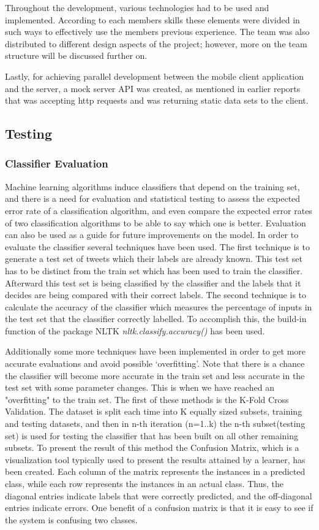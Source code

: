 Throughout the development, various technologies had to be used and implemented. According to each 
members skills these elements were divided in such ways to effectively use the members previous 
experience. The team was also distributed to different design aspects of the project; however, more on the 
team structure will be discussed further on.

Lastly, for achieving parallel development between the mobile client application and the server, 
a mock server API was created, as mentioned in earlier reports that was accepting http requests and 
was returning static data sets to the client. 

\subsection{Testing} 
\subsubsection{Classifier Evaluation} 
Machine learning algorithms induce classifiers that depend on the training set, and there is a need for evaluation and statistical testing to assess the expected error rate of a classification algorithm, and even compare the expected error rates of two classification algorithms to be able to say which one is better. Evaluation can also be used as a guide for future improvements on the model. In order to evaluate the classifier several techniques have been used. The first technique is to generate a test set of tweets which their labels are already known. This test set has to be distinct from the train set which has been used to train the classifier. Afterward this test set is being classified by the classifier and the labels that it decides are being compared with their correct labels. The second technique is to calculate the accuracy of the classifier which measures the percentage of inputs in the test set that the classifier correctly labelled. To accomplish this, the build-in function of the package NLTK \emph{nltk.classify.accuracy()} has been used.

Additionally some more techniques have been implemented in order to get more
accurate evaluations and avoid possible `overfitting'. Note that there is a chance the classifier will become more accurate in the train set and less accurate in the test set with some parameter changes. This is when we have reached an "overfitting" to the train set. The first of these methods is the K-Fold Cross Validation. The dataset is split each time into K equally sized subsets, training and testing datasets, and then in n-th iteration (n=1..k) the n-th subset(testing set) is used for testing the classifier that has been built on all other remaining subsets. To present the result of this method the Confusion Matrix, which is a visualization tool typically used to present the results attained by a learner, has been created. Each column of the matrix represents the instances in a predicted class, while each row represents the instances in an actual class. Thus, the diagonal entries indicate labels that were correctly predicted, and the off-diagonal entries indicate errors. One benefit of a confusion matrix is that it is easy to see if the system is confusing two classes.

